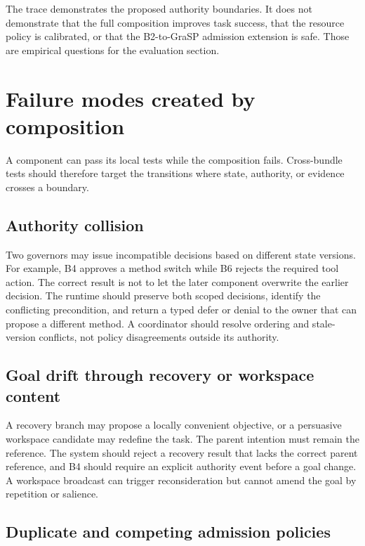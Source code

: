 The trace demonstrates the proposed authority boundaries. It does not demonstrate that the full composition improves task success, that the resource policy is calibrated, or that the B2-to-GraSP admission extension is safe. Those are empirical questions for the evaluation section.

\section{Failure modes created by composition}
\label{sec:ch18-compositional-failures}

A component can pass its local tests while the composition fails. Cross-bundle tests should therefore target the transitions where state, authority, or evidence crosses a boundary.

\subsection{Authority collision}
\label{subsec:ch18-authority-collision}

Two governors may issue incompatible decisions based on different state versions. For example, B4 approves a method switch while B6 rejects the required tool action. The correct result is not to let the later component overwrite the earlier decision. The runtime should preserve both scoped decisions, identify the conflicting precondition, and return a typed defer or denial to the owner that can propose a different method. A coordinator should resolve ordering and stale-version conflicts, not policy disagreements outside its authority.

\subsection{Goal drift through recovery or workspace content}
\label{subsec:ch18-goal-drift}

A recovery branch may propose a locally convenient objective, or a persuasive workspace candidate may redefine the task. The parent intention must remain the reference. The system should reject a recovery result that lacks the correct parent reference, and B4 should require an explicit authority event before a goal change. A workspace broadcast can trigger reconsideration but cannot amend the goal by repetition or salience.

\subsection{Duplicate and competing admission policies}
\label{subsec:ch18-admission-duplication}

